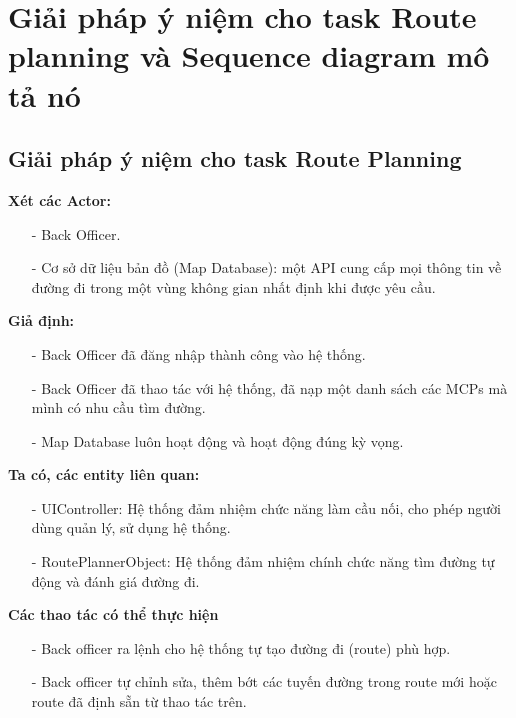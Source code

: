 \section{Giải pháp ý niệm cho task Route planning và Sequence diagram mô tả nó}
    \subsection{Giải pháp ý niệm cho task Route Planning}
        \textbf{Xét các Actor: }
    
        \begin{itemize}
            \item[-] Back Officer.
            \item[-] Cơ sở dữ liệu bản đồ (Map Database): một API cung cấp mọi thông tin về đường đi trong một vùng không gian nhất định khi được yêu cầu.
        \end{itemize}
    
        \textbf{Giả định:}
    
        \begin{itemize}
            \item[-] Back Officer đã đăng nhập thành công vào hệ thống.
            \item[-] Back Officer đã thao tác với hệ thống, đã nạp một danh sách các MCPs mà mình có nhu cầu tìm đường.
            \item[-] Map Database luôn hoạt động và hoạt động đúng kỳ vọng.
        \end{itemize}
    
        \textbf{Ta có, các entity liên quan:}
    
        \begin{itemize}
            \item[-] UIController: Hệ thống đảm nhiệm chức năng làm cầu nối, cho phép người dùng quản lý, sử dụng hệ thống.
            \item[-] RoutePlannerObject: Hệ thống đảm nhiệm chính chức năng tìm đường tự động và đánh giá đường đi.
        \end{itemize}
    
        \textbf{Các thao tác có thể thực hiện}
    
        \begin{itemize}
            \item[-] Back officer ra lệnh cho hệ thống tự tạo đường đi (route) phù hợp.
            \item[-] Back officer tự chỉnh sửa, thêm bớt các tuyến đường trong route mới hoặc route đã định sẵn từ thao tác trên.
        \end{itemize}
    
